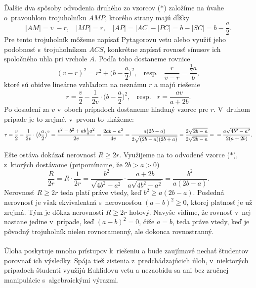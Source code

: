 {Ďalšie dva spôsoby odvodenia druhého zo vzorcov ($\ast$) založíme na úvahe o~pravouhlom trojuholníku $AMP$, ktorého strany majú dĺžky
$$|AM| = v~-r, \ \ \ \ |MP| = r, \ \ \ \ |AP| = |AC| - |PC| = b - |SC| = b - \frac{a}{2}.$$
Pre tento trojuholník môžeme napísať Pytagorovu vetu alebo využiť jeho podobnosť s~trojuholníkom $ACS$, konkrétne zapísať rovnosť sínusov ich spoločného uhla pri vrchole $A$. Podľa toho dostaneme rovnice
$$(v - r)^2= r^2+\big(b -\frac{a}{2}\big)^2, \ \ \ \ \text{resp.} \ \ \ \ \frac{r}{v-r}=  \frac{\frac{1}{2}a}{b},$$
ktoré sú obidve lineárne vzhľadom na neznámu $r$ a majú riešenie
$$r = \frac{v}{2}-\frac{1}{2v}\cdot \big( b - \frac{a}{2} \big)^2, \ \ \ \ \text{resp.}\ \ \ \  r=
\frac{av}{a+2b}.$$
Po dosadení za $v$ v~oboch prípadoch dostaneme hľadaný vzorec pre $r$. V~druhom prípade
je to zrejmé, v~prvom to ukážeme:
$$r =\frac{v}{2}  - \frac{1}{2v} \cdot \big(b \frac{a}{2}\big)^2= \frac{v^2 - b^2 + ab \frac{1}{4}a^2}{2v}=\frac{2ab - a^2}{4v}=\frac{a(2b - a)}{2\sqrt{(2b -a)(2b + a)}}=\frac{2\sqrt{2b-a}}{2\sqrt{2b-a}}= \\ =\frac{a \sqrt{4b^2 -a^2}}{2(a + 2b)}.$$

Ešte ostáva dokázať nerovnosť $R \geq 2r$. Využijeme na to odvodené vzorce ($\ast$), z~ktorých dostávame (pripomíname, že $2b > a > 0$)
$$ \frac{R}{2r}= R \cdot \frac{1}{2r}=\frac{b^2}{\sqrt{4b^2-a^2}}\cdot \frac{a+2b}{a \sqrt{4b^2-a^2}}=\frac{b^2}{a(2b-a)}.$$
Nerovnosť $R \geq 2r$ teda platí práve vtedy, keď $b^2\geq a(2b -a)$. Posledná nerovnosť je však ekvivalentná s~nerovnosťou $(a - b)^2\geq 0$, ktorej platnosť je už zrejmá. Tým je dôkaz nerovnosti $R \geq 2r$ hotový. Navyše vidíme, že rovnosť v~nej nastane jedine v~prípade, keď $(a - b)^2 = 0$, čiže $a = b$, teda práve vtedy, keď je pôvodný trojuholník nielen rovnoramenný, ale dokonca rovnostranný.\\
\\
\kom Úloha poskytuje mnoho prístupov k~riešeniu a bude zaujímavé nechať študentov porovnať ich výsledky. Spája tiež zistenia z~predchádzajúcich úloh, v~niektorých prípadoch študenti využijú Euklidovu vetu a nezaobídu sa ani bez zručnej manipulácie s~algebraickými výrazmi. \\
\\
}
